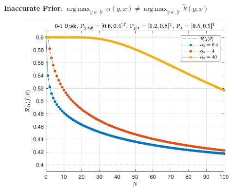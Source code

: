 \documentclass[aspectratio=169,usenames,dvipsnames]{beamer}
\DeclareMathOperator*{\argmax}{arg\,max}
\DeclareMathOperator{\Ycal}{\mathcal{Y}}
\begin{document}
\begin{frame}
\begin{columns}[c]
\begin{column}{0.5\linewidth}
\centering
\textbf{Inaccurate Prior}: $\argmax_{y \in \Ycal} \alpha(y,x) \neq \argmax_{y \in \Ycal} \tilde{\theta}(y;x)$
%
\begin{figure}
\centering
\includegraphics[width=0.9\linewidth]{Risk_cond_01_Dir_N_leg_a0__subj_bad.pdf}
\end{figure}

\end{column}

\end{columns}

\centering
{}

\end{frame}
\end{document}
